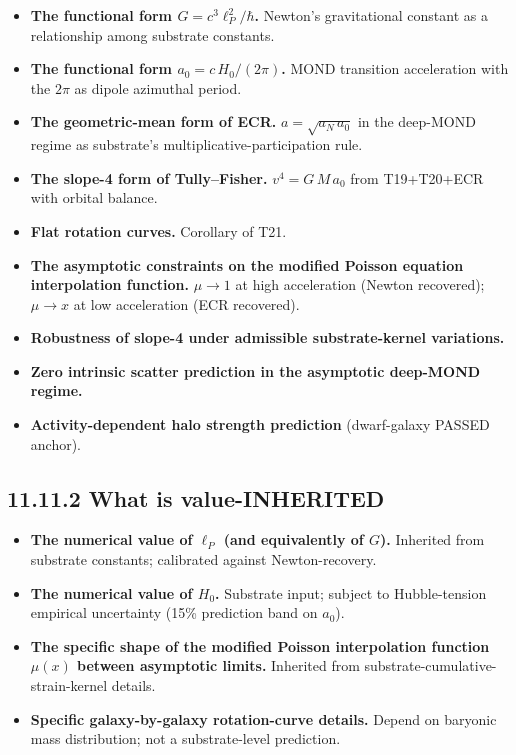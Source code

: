 \documentclass[11pt]{book}
\begin{document}
\begin{itemize}
\item \textbf{The functional form $G = c^3\ell_P^2/\hbar$.} Newton's gravitational constant as a relationship among substrate constants.
\item \textbf{The functional form $a_0 = c\,H_0/(2\pi)$.} MOND transition acceleration with the $2\pi$ as dipole azimuthal period.
\item \textbf{The geometric-mean form of ECR.} $a = \sqrt{a_N\,a_0}$ in the deep-MOND regime as substrate's multiplicative-participation rule.
\item \textbf{The slope-4 form of Tully–Fisher.} $v^4 = G\,M\,a_0$ from T19+T20+ECR with orbital balance.
\item \textbf{Flat rotation curves.} Corollary of T21.
\item \textbf{The asymptotic constraints on the modified Poisson equation interpolation function.} $\mu \to 1$ at high acceleration (Newton recovered); $\mu \to x$ at low acceleration (ECR recovered).
\item \textbf{Robustness of slope-4 under admissible substrate-kernel variations.}
\item \textbf{Zero intrinsic scatter prediction in the asymptotic deep-MOND regime.}
\item \textbf{Activity-dependent halo strength prediction} (dwarf-galaxy PASSED anchor).
\end{itemize}

\subsection{11.11.2 What is value-INHERITED}

\begin{itemize}
\item \textbf{The numerical value of $\ell_P$ (and equivalently of $G$).} Inherited from substrate constants; calibrated against Newton-recovery.
\item \textbf{The numerical value of $H_0$.} Substrate input; subject to Hubble-tension empirical uncertainty (15\% prediction band on $a_0$).
\item \textbf{The specific shape of the modified Poisson interpolation function $\mu(x)$ between asymptotic limits.} Inherited from substrate-cumulative-strain-kernel details.
\item \textbf{Specific galaxy-by-galaxy rotation-curve details.} Depend on baryonic mass distribution; not a substrate-level prediction.
\end{itemize}
\end{document}
